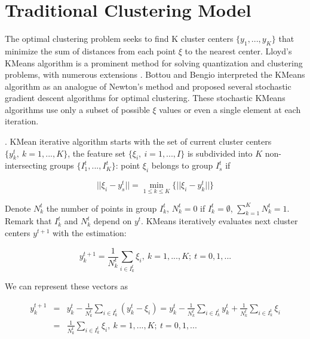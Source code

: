 \section{Traditional Clustering Model}

The optimal clustering problem seeks to find K cluster centers $ \{ y_1, ..., y_K \} $ that minimize the sum of distances from each point $ \xi $ to the nearest center. Lloyd's KMeans algorithm \cite{Lloyd_1982} is a prominent method for solving quantization and clustering problems, with numerous extensions \cite{Jain_2010}. Bottou and Bengio \cite{Bottou_1994} interpreted the KMeans algorithm as an analogue of Newton's method and proposed several stochastic gradient descent algorithms for optimal clustering. These stochastic KMeans algorithms use only a subset of possible $ \xi $ values or even a single element at each iteration.

\begin{definition}
    \label{KMeans} \cite{Lloyd_1982}. KMean iterative algorithm starts with the set of current cluster centers $ \{ y_k^t, \> k = 1, ..., K \} $, the feature set $ \{ \xi_i, \> i = 1, ..., I \} $ is subdivided into $ K $ non-intersecting groups $ \{ I_1^t, ..., I_K^t \} $: point $ \xi_i $ belongs to group $ I_s^t $ if

    \begin{equation}
        \label{kmeans-group:eq}
            || \xi_i - y_s^t || = \min_{1 \leq k \leq K} \{ || \xi_i - y_k^t || \}
    \end{equation}

    \noindent Denote $ N_k^t $ the number of points in group $ I_k^t $, $ N_k^t = 0 $ if $ I_k^t = \emptyset $, $ \sum_{k=1}^K N_k^t = 1 $. Remark that $ I_k^t $ and $ N_k^t $ depend on $ y^t $. KMeans iteratively evaluates next cluster centers $ y^{t+1} $ with the estimation:

    \begin{equation}
        \label{kmeans-center-estimation:eq}
            y_{k}^{t + 1} = \frac{1}{N_k^t} \sum_{i \in I_k^t} \xi_i, \> k = 1, ..., K; \> t = 0, 1, ...
    \end{equation}

    \noindent We can represent these vectors as

    \begin{eqnarray}
        \label{kmeans-center-alt:eq}
            y_{k}^{t + 1} &=& y_k^t - \frac{1}{N_k^t} \sum_{i \in I_k^t} (y_k^t - \xi_i) = y_k^t - \frac{1}{N_k^t} \sum_{i \in I_k^t} y_k^t + \frac{1}{N_k^t} \sum_{i \in I_k^t} \xi_i \nonumber \\
            &=& \frac{1}{N_k^t} \sum_{i \in I_k^t} \xi_i, \> k = 1, ..., K; \> t = 0, 1, ...
    \end{eqnarray}
\end{definition}

